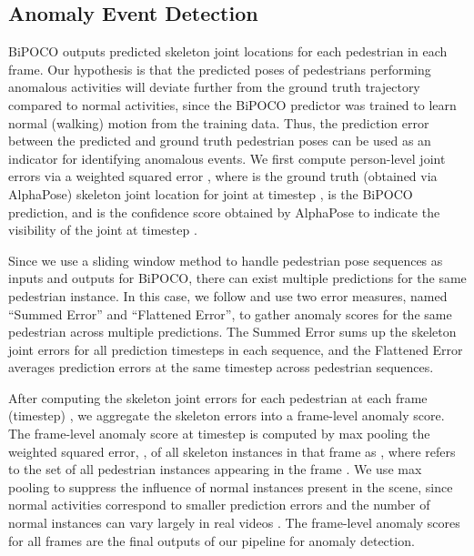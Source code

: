 \documentclass[nohyperref]{article}
\theoremstyle{plain}
\theoremstyle{definition}
\theoremstyle{remark}
\begin{document}
\subsection{Anomaly Event Detection}
\label{sec:anomaly}
\vspace{-2mm}
BiPOCO outputs predicted skeleton joint locations for each pedestrian in each frame. Our hypothesis is that the predicted poses of pedestrians performing anomalous activities will deviate further from the ground truth trajectory compared to normal activities, since the BiPOCO predictor was trained to learn normal (walking) motion from the training data. Thus, the prediction error between the predicted and ground truth pedestrian poses can be used as an indicator for identifying anomalous events. We first compute person-level joint errors via a weighted  squared error ,
where  is the ground truth (obtained via AlphaPose) skeleton joint location for  joint at timestep ,  is the BiPOCO prediction, and   is the confidence score obtained by AlphaPose to indicate the visibility of the  joint  at timestep . 

\vspace{-1mm}
Since we use a sliding window method to handle pedestrian pose sequences as inputs and outputs for BiPOCO, there can exist multiple predictions for the same pedestrian instance. In this case, we follow \cite{kanu2021leveraging} and use two error measures, named ``Summed Error'' and ``Flattened Error'', to gather anomaly scores for the same pedestrian across multiple predictions. The Summed Error sums up the skeleton joint errors for all prediction timesteps in each sequence, and the Flattened Error averages prediction errors at the same timestep across pedestrian sequences.
\vspace{-1mm}

After computing the skeleton joint errors for each pedestrian  at each frame (timestep) , we aggregate the skeleton errors into a frame-level anomaly score. The frame-level anomaly score at timestep  is computed by max pooling the weighted squared error, , of all skeleton instances in that frame as ,
where  refers to the set of all pedestrian instances appearing in the frame . We use max pooling to suppress the influence of normal instances present in the
scene, since normal activities correspond to smaller prediction errors and the number of normal instances can vary largely in real videos  \cite{morais2019learning}. The frame-level
anomaly scores for all frames  are the final outputs of our
pipeline for anomaly detection.
\end{document}
